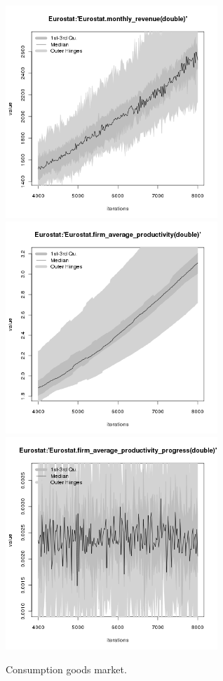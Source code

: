 \begin{figure}[H!]
\begin{minipage}{17cm}
\includegraphics[width=8cm]{./png/tax_0.05/Eurostat-monthly_revenue.png}\\
\includegraphics[width=8cm]{./png/tax_0.05/Eurostat-firm_average_productivity.png}
\includegraphics[width=8cm]{./png/tax_0.05/Eurostat-firm_average_productivity_progress.png}
\end{minipage}
\caption{Consumption goods market.}
\label{Figure: Consumption Market}
\end{figure}
\clearpage


